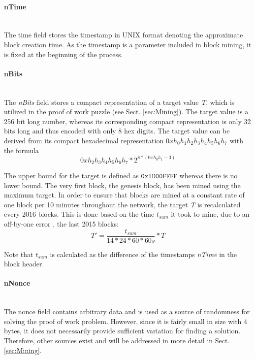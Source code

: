 \paragraph{nTime}~\\
The time field stores the timestamp in UNIX format denoting the approximate block creation time. As the timestamp is a parameter included in block mining, it is fixed at the beginning of the process.


\paragraph{nBits}~\\
The \textit{nBits} field stores a compact representation of a target value \emph{T}, which is utilized in the proof of work puzzle (see Sect. \ref{sec:Mining}). The target value is a 256 bit long number, whereas its corresponding compact representation is only 32 bits long and thus encoded with only 8 hex digits. The target value can be derived from its compact hexadecimal representation $\mathit{0xh_{0}h_{1}h_{2}h_{3}h_{4}h_{5}h_{6}h_{7}}$ with the formula
\begin{equation}
0xh_{2}h_{3}h_{4}h_{5}h_{6}h_{7} * 2^{8*(0xh_{0}h_{1} - 3)}
\end{equation}


\noindent
The upper bound for the target is defined as $\texttt{0x1D00FFFF}$ whereas there is no lower bound. The very first block, the genesis block, has been mined using the maximum target. In order to ensure that blocks are mined at a constant rate of one block per 10 minutes throughout the network, the target \emph{T} is recalculated every 2016 blocks. This is done based on the time $\mathit{t_{sum}}$ it took to mine, due to an off-by-one error \cite{nBitsCalc}, the last 2015 blocks:
\begin{equation}
T' = \dfrac{t_{sum}}{14*24*60*60s}*T
\end{equation}

\noindent
Note that $\mathit{t_{sum}}$ is calculated as the difference of the timestamps \textit{nTime} in the block header.

\paragraph{nNonce}~\\
The nonce field contains arbitrary data and is used as a source of randomness for solving the proof of work problem. However, since it is fairly small in size with 4 bytes, it does not necessarily provide sufficient variation for finding a solution. Therefore, other sources exist and will be addressed in more detail in Sect. \ref{sec:Mining}.



